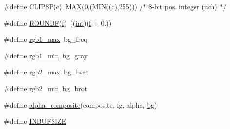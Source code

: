 \begin{DoxyCompactItemize}
\item 
\#define \mbox{\hyperlink{rpng2-win_8c_a59dbc34417cea1957b04dbd47534fbaa}{C\+L\+I\+P8P}}(\mbox{\hyperlink{isa-lr35902_8c_ab27f9f98dd173bfc694f5d161e839d6e}{c}})~\mbox{\hyperlink{sqlite3_8c_ad935f1ff1a50822e317bdb321ce991ad}{M\+AX}}(0,(\mbox{\hyperlink{sqlite3_8c_adcd021ac91d43a62b2cdecf9a5b971a7}{M\+IN}}((\mbox{\hyperlink{isa-lr35902_8c_ab27f9f98dd173bfc694f5d161e839d6e}{c}}),255)))   /$\ast$ 8-\/bit pos. integer (\mbox{\hyperlink{readpng_8h_af3307af5922c72924a837559c801a8a4}{uch}}) $\ast$/
\item 
\#define \mbox{\hyperlink{rpng2-win_8c_afecc38967871feedc120e1d3650d387e}{R\+O\+U\+N\+DF}}(\mbox{\hyperlink{isa-arm_8c_a362077c979b0bb65159c603270e40f70}{f}})~((\mbox{\hyperlink{ioapi_8h_a787fa3cf048117ba7123753c1e74fcd6}{int}})(\mbox{\hyperlink{isa-arm_8c_a362077c979b0bb65159c603270e40f70}{f}} + 0.))
\item 
\#define \mbox{\hyperlink{rpng2-win_8c_a2fff10e39e5f260c02e0d3ca6f0d0767}{rgb1\+\_\+max}}~bg\+\_\+freq
\item 
\#define \mbox{\hyperlink{rpng2-win_8c_a296f60be08dd0f77ffa8567145fb420b}{rgb1\+\_\+min}}~bg\+\_\+gray
\item 
\#define \mbox{\hyperlink{rpng2-win_8c_a302c6a6f0caef8546ccf8d25e2ba0217}{rgb2\+\_\+max}}~bg\+\_\+bsat
\item 
\#define \mbox{\hyperlink{rpng2-win_8c_a9de071f4fad1348f0344e55ab384f2a3}{rgb2\+\_\+min}}~bg\+\_\+brot
\item 
\#define \mbox{\hyperlink{rpng2-win_8c_af1fe887e7346a25e71f3b1527e723692}{alpha\+\_\+composite}}(composite,  fg,  alpha,  \mbox{\hyperlink{rpng2-x_8c_a808fa6d3573a86afa3ba7698a65b1ef6}{bg}})
\item 
\#define \mbox{\hyperlink{rpng2-win_8c_ab3f00dac33458432279d4308226d8413}{I\+N\+B\+U\+F\+S\+I\+ZE}}
\end{DoxyCompactItemize}
